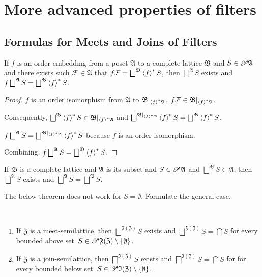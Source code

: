 \section{More advanced properties of filters}


\subsection{Formulas for Meets and Joins of Filters}
\begin{lem}
\label{embed-lemma}If $f$ is an order embedding from a poset $\mathfrak{A}$
to a complete lattice $\mathfrak{B}$ and $S\in\mathscr{P}\mathfrak{A}$
and there exists such $\mathcal{F}\in\mathfrak{A}$ that $f\mathcal{F}=\bigsqcup^{\mathfrak{B}}\rsupfun fS$,
then $\bigsqcup^{\mathfrak{A}}S$ exists and $f\bigsqcup^{\mathfrak{A}}S=\bigsqcup^{\mathfrak{B}}\rsupfun fS$.\end{lem}
\begin{proof}
$f$ is an order isomorphism from $\mathfrak{A}$ to $\mathfrak{B}|_{\left\langle f\right\rangle ^{\ast}\mathfrak{A}}$.
$f\mathcal{F}\in\mathfrak{B}|_{\left\langle f\right\rangle ^{\ast}\mathfrak{A}}$.

Consequently, $\bigsqcup^{\mathfrak{B}}\rsupfun fS\in\mathfrak{B}|_{\rsupfun f\mathfrak{A}}$
and $\bigsqcup^{\mathfrak{B}|_{\rsupfun f\mathfrak{A}}}\rsupfun fS=\bigsqcup^{\mathfrak{B}}\rsupfun fS$.

$f\bigsqcup^{\mathfrak{A}}S=\bigsqcup^{\mathfrak{B}|_{\rsupfun f\mathfrak{A}}}\rsupfun fS$
because $f$ is an order isomorphism.

Combining, $f\bigsqcup^{\mathfrak{A}}S=\bigsqcup^{\mathfrak{B}}\rsupfun fS$.\end{proof}
\begin{cor}
If $\mathfrak{B}$ is a complete lattice and $\mathfrak{A}$ is its
subset and $S\in\mathscr{P}\mathfrak{A}$ and $\bigsqcup^{\mathfrak{B}}S\in\mathfrak{A}$,
then $\bigsqcup^{\mathfrak{A}}S$
exists and $\bigsqcup^{\mathfrak{A}}S=\bigsqcup^{\mathfrak{B}}S$.\end{cor}

\begin{xca}
The below theorem does not work for $S=\emptyset$. Formulate the general case.
\end{xca}

\begin{thm}\label{join-filt-gen}
~
\begin{enumerate}
\item \label{inf-lat-filt-b} If $\mathfrak{Z}$ is a meet-semilattice, then $\bigsqcup^{\mathfrak{F}(\mathfrak{Z})}S$
exists and $\bigsqcup^{\mathfrak{F}(\mathfrak{Z})}S=\bigcap S$ for every bounded above set~$S\in\mathscr{P}\mathfrak{F}(\mathfrak{Z})\setminus\{\emptyset\}$.
\item \label{inf-lat-ideal-b} If $\mathfrak{Z}$ is a join-semilattice, then $\bigsqcap^{\mathfrak{I}(\mathfrak{Z})}S$ exists
and $\bigsqcap^{\mathfrak{I}(\mathfrak{Z})}S=\bigcap S$ for for every bounded below set~$S\in\mathscr{P}\mathfrak{I}(\mathfrak{Z})\setminus\{\emptyset\}$.
\end{enumerate}
\end{thm}

